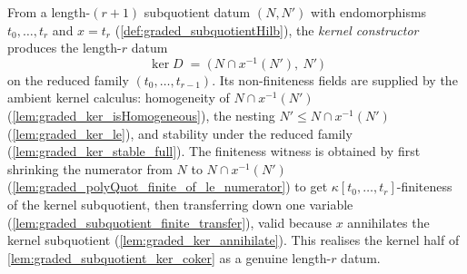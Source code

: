 \begin{definition}\leanok
  \label{def:graded_subquotientDatum_ker}
  From a length-\((r+1)\) subquotient datum \((N, N')\) with endomorphisms
  \(t_0, \dots, t_r\) and \(x = t_r\) (\cref{def:graded_subquotientHilb}), the
  \emph{kernel constructor} produces the length-\(r\) datum
  \[
    \ker D \;=\; \bigl(\,N \cap x^{-1}(N'),\ N'\,\bigr)
  \]
  on the reduced family \((t_0, \dots, t_{r-1})\). Its
  non-finiteness fields are supplied by the ambient kernel calculus: homogeneity of
  \(N \cap x^{-1}(N')\) (\cref{lem:graded_ker_isHomogeneous}), the nesting
  \(N' \le N \cap x^{-1}(N')\) (\cref{lem:graded_ker_le}), and stability under the
  reduced family (\cref{lem:graded_ker_stable_full}). The finiteness witness
  is obtained by first shrinking the numerator from \(N\) to
  \(N \cap x^{-1}(N')\) (\cref{lem:graded_polyQuot_finite_of_le_numerator}) to get
  \(\kappa[t_0, \dots, t_r]\)-finiteness of the kernel subquotient, then transferring
  down one variable (\cref{lem:graded_subquotient_finite_transfer}), valid because
  \(x\) annihilates the kernel subquotient (\cref{lem:graded_ker_annihilate}). This
  realises the kernel half of \cref{lem:graded_subquotient_ker_coker} as a genuine
  length-\(r\) datum.
\end{definition}

